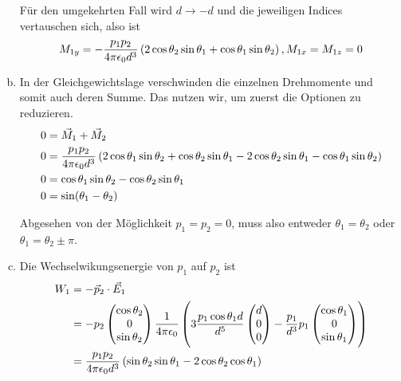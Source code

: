 \documentclass[a4paper,german,12pt,smallheadings]{scrartcl}
\begin{document}
\begin{enumerate}[a)]
    Für den umgekehrten Fall wird $d \to -d$ und die jeweiligen Indices
    vertauschen sich, also ist
    \begin{equation}
      M_{1y} = -\frac{p_1p_2}{4 \pi \epsilon_0 d^3} \del{
        2 \cos \theta_2 \sin \theta_1 + \cos \theta_1 \sin \theta_2
      }, M_{1x} = M_{1z} = 0
    \end{equation}
  \item

    In der Gleichgewichtslage verschwinden die einzelnen Drehmomente und somit
    auch deren Summe. Das nutzen wir, um zuerst die Optionen zu reduzieren.
    \begin{align}
      0 &= \vec{M}_1 + \vec{M}_2 \\
      0 &= \frac{p_1 p_2}{4 \pi \epsilon_0 d^3} \del{
          2 \cos \theta_1 \sin \theta_2 + \cos \theta_2 \sin \theta_1 -
          2 \cos \theta_2 \sin \theta_1 - \cos \theta_1 \sin \theta_2
        } \\
      0 &= \cos \theta_1 \sin \theta_2 - \cos \theta_2 \sin \theta_1 \\
      0 &= \sin(\theta_1 - \theta_2)
    \end{align}

    Abgesehen von der Möglichkeit $p_1 = p_2 = 0$, muss also entweder $\theta_1
    = \theta_2$ oder $\theta_1 = \theta_2 \pm \pi$.


  \item
    Die Wechselwikungsenergie von $p_1$ auf $p_2$ ist
    \begin{align*}
      W_1 &= - \vec{p}_2 \cdot \vec{E}_1 \\
        &= - p_2 \begin{pmatrix}
          \cos \theta_2 \\ 0 \\ \sin \theta_2
        \end{pmatrix}
        \frac{1}{4 \pi \epsilon_0} \del {
          3 \frac{p_1 \cos \theta_1 d}{d^5} \begin{pmatrix}
            d \\ 0 \\ 0
          \end{pmatrix}
          -
          \frac{p_1}{d^3} p_1 \begin{pmatrix}
            \cos \theta_1 \\ 0 \\ \sin \theta_1
          \end{pmatrix}
        } \\
        &= \frac{p_1 p_2}{4 \pi \epsilon_0 d^3 } \del{
          \sin \theta_2 \sin \theta_1 - 2 \cos \theta_2 \cos \theta_1
        }
    \end{align*}


\end{enumerate}
\end{document}
